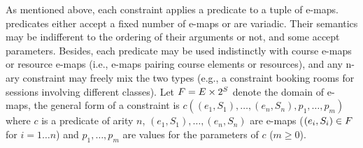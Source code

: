 As mentioned above, 
each %
constraint applies a predicate to a tuple of e-maps.
\UTP{} predicates %
either accept a fixed number of %
e-maps %
or are variadic.
Their semantics may be indifferent to the ordering of their arguments or not,
and some accept parameters.
Besides, each predicate may be used indistinctly
with course e-maps or resource e-maps (i.e., e-maps pairing course elements or resources),
and any n-ary constraint may freely mix the two types
(e.g., a constraint booking rooms for sessions involving different classes).
Let ${F}=E\times{2^{S}}$ denote the domain of e-maps,
the general form of a %
constraint is
$c((e_1,S_1),\ldots,(e_n,S_n),p_1,\ldots,p_m)$ %
where 
$c$ is a predicate of arity $n$,
$(e_1,S_1),\ldots,(e_n,S_n)$ are e-maps ($(e_i,S_i)\in{F}$ for $i=1\ldots n$) 
and 
$p_1,\ldots,p_m$ are values for the parameters of $c$ ($m\geq0$).

